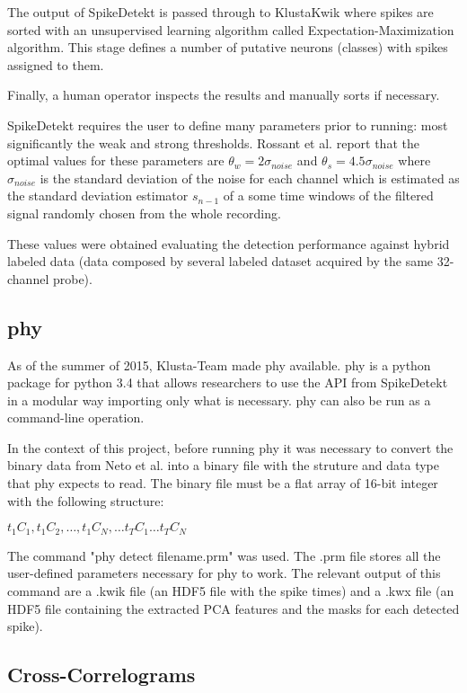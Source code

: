 The output of SpikeDetekt is passed through to KlustaKwik where spikes are sorted with an unsupervised learning algorithm called Expectation-Maximization algorithm. This stage defines a number of putative neurons (classes) with spikes assigned to them.

Finally, a human operator inspects the results and manually sorts if necessary.

SpikeDetekt requires the user to define many parameters prior to running: most significantly the  weak and strong thresholds.  Rossant et al. report that the optimal values for these parameters are $\theta_w = 2 \sigma_{noise}$ and $\theta_s = 4.5 \sigma_{noise}$ where $\sigma_{noise}$ is the standard deviation of the noise for each channel which is estimated as the standard deviation estimator $s_{n-1}$ of a some time windows of the filtered signal randomly chosen from the whole recording.

These values were obtained evaluating the detection performance against hybrid labeled data (data composed by several labeled dataset acquired by the same 32-channel probe). 

\subsection{phy}
\label{subsec:phy}
As of the summer of 2015, Klusta-Team made phy available. phy is a python package for python 3.4 that allows researchers to use the API from SpikeDetekt in a modular way importing only what is necessary. phy can also be run as a command-line operation.

In the context of this project, before running phy it was necessary to convert the binary data from Neto et al. into a binary file with the struture and data type that phy expects to read. The binary file must be a flat array of 16-bit integer with the following structure:

$t_1C_1 , t_1C_2, \ldots , t_1C_N, \ldots t_TC_1 \ldots t_TC_N$ %

The command "phy detect filename.prm" was used. The .prm file stores all the user-defined parameters necessary for phy to work. The relevant output of this command are a .kwik file (an HDF5 file with the spike times) and a .kwx file (an HDF5 file containing the extracted PCA features and the masks for each detected spike).

\subsection{Cross-Correlograms}
\label{subsec:CC}

